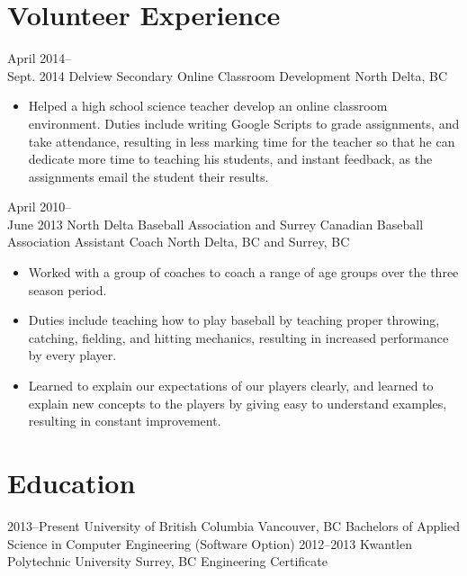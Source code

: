 \documentclass[]{friggeri-cv} %
\begin{document}
\section{Volunteer Experience}

\begin{entrylist}

\entry
{April 2014--\\Sept. 2014}
{Delview Secondary {\normalfont Online Classroom Development}}
{North Delta, BC}
{
\begin{itemize}
\item Helped a high school science teacher develop an online classroom
environment. Duties include writing Google
Scripts to grade assignments, and take attendance, resulting in less marking
time for the teacher so that he can
dedicate more time to teaching his students, and instant feedback, as the
assignments email the student their
results.
\end{itemize}
}

\entry
{April 2010--\\June 2013}
{North Delta Baseball Association and Surrey Canadian Baseball Association {\normalfont Assistant Coach}}
{North Delta, BC and Surrey, BC}
{
\begin{itemize}
\item Worked with a group of coaches to coach a range of age groups over the three
season period.
\item Duties include teaching how to play baseball by teaching proper throwing,
catching, fielding, and hitting
mechanics, resulting in increased performance by every player.
\item Learned to explain our expectations of our players clearly, and learned to
explain new concepts to the players
by giving easy to understand examples, resulting in constant improvement.
\end{itemize}
}
\end{entrylist}

\newpage


\section{Education}

\begin{entrylist}
\entry
{2013--Present}
{University of British Columbia}  %
{Vancouver, BC}
{Bachelors of Applied Science in Computer Engineering (Software Option)}
\entry
{2012--2013}
{Kwantlen Polytechnic University} %
{Surrey, BC}
{Engineering Certificate}
\end{entrylist}
\end{document}
